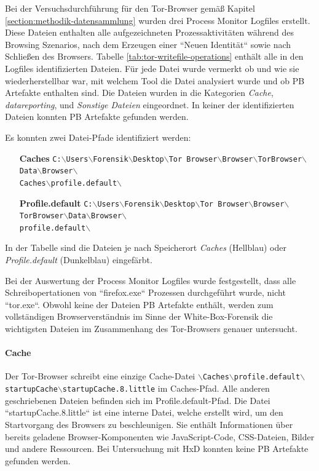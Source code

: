 \begin{appendices}
Bei der Versuchsdurchführung für den Tor-Browser gemäß Kapitel \ref{section:methodik-datensammlung} wurden drei Process Monitor Logfiles erstellt.
Diese Dateien enthalten alle aufgezeichneten Prozessaktivitäten während des Browsing Szenarios, nach dem Erzeugen einer ``Neuen Identität`` sowie nach Schließen des Browsers.
Tabelle \ref{tab:tor-writefile-operations} enthält alle in den Logfiles identifizierten Dateien.
Für jede Datei wurde vermerkt ob und wie sie wiederherstellbar war, mit welchem Tool die Datei analysiert wurde und ob PB Artefakte enthalten sind.
Die Dateien wurden in die Kategorien \textit{Cache}, \textit{datareporting}, und \textit{Sonstige Dateien} eingeordnet.
In keiner der identifizierten Dateien konnten PB Artefakte gefunden werden. 

Es konnten zwei Datei-Pfade identifiziert werden:
\begin{itemize}
\item[\textbf{Caches}] \texttt{C:$\backslash$Users$\backslash$Forensik$\backslash$Desktop$\backslash$Tor Browser$\backslash$Browser$\backslash$TorBrowser$\backslash$Data$\backslash$Browser$\backslash$\\Caches$\backslash$profile.default$\backslash$}
\item[\textbf{Profile.default}] \texttt{C:$\backslash$Users$\backslash$Forensik$\backslash$Desktop$\backslash$Tor Browser$\backslash$Browser$\backslash$TorBrowser$\backslash$Data$\backslash$Browser$\backslash$\\profile.default$\backslash$}
\end{itemize}
In der Tabelle sind die Dateien je nach Speicherort \textit{Caches} (Hellblau) oder \textit{Profile.default} (Dunkelblau) eingefärbt. 

Bei der Auswertung der Process Monitor Logfiles wurde festgestellt, dass alle Schreibopertationen von ``firefox.exe`` Prozessen durchgeführt wurde, nicht ``tor.exe``. Obwohl keine der Dateien PB Artefakte enthält, werden zum vollständigen Browserverständnis im Sinne der White-Box-Forensik die wichtigsten Dateien im Zusammenhang des Tor-Browsers genauer untersucht.

\paragraph*{Cache}
Der Tor-Browser schreibt eine einzige Cache-Datei \texttt{$\backslash$Caches$\backslash$profile.default$\backslash$\\startupCache$\backslash$startupCache.8.little} im Caches-Pfad. Alle anderen geschriebenen Dateien befinden sich im Profile.default-Pfad.
Die Datei ``startupCache.8.little`` ist eine interne Datei, welche erstellt wird, um den Startvorgang des Browsers zu beschleunigen. Sie enthält Informationen über bereits geladene Browser-Komponenten wie JavaScript-Code, CSS-Dateien, Bilder und andere Ressourcen. \cite{MozillaWiki.05.06.2023} 
Bei Untersuchung mit HxD konnten keine PB Artefakte gefunden werden.


\end{appendices}
